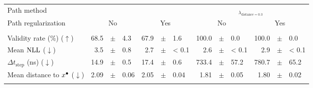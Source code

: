 \documentclass[../main.tex]{subfiles}
\begin{document}
\footnotesize
\begin{adjustwidth}{-2.7in}{-3in}
	\begin{center}
		\begin{tabular}{lrllrllrllrll}
			\toprule
			Path method                                    & \multicolumn{6}{c}{\ls{}}                  & \multicolumn{6}{c}{\revise{}$_{\lambda_{\text{distance} = 0.3}}$}                                                                                                                           \\
			Path regularization                            & \multicolumn{3}{c}{No}                     & \multicolumn{3}{c}{Yes}                                           & \multicolumn{3}{c}{No} & \multicolumn{3}{c}{Yes}                                                                        \\
			\midrule
			                                               & \multicolumn{12}{c}{\CakeOnSea}                                                                                                                                                                                                          \\
			\cmidrule(lr){2-13}
			Validity rate (\%) ($\uparrow$)                & 68.5                                       & $\pm$                                                             & 4.3                    & 67.9                    & $\pm$ & 1.6     & 100.0  & $\pm$ & 0.0   & 100.0   & $\pm$ & 0.0     \\
			Mean $\text{NLL}$ ($\downarrow$)                     & 3.5                                        & $\pm$                                                             & 0.8                    & 2.7                     & $\pm$ & < 0.1   & 2.6    & $\pm$ & < 0.1 & 2.9     & $\pm$ & < 0.1   \\
			$\Delta t_\text{step}$ (ns) ($\downarrow$)     & 14.9                                       & $\pm$                                                             & 0.5                    & 17.4                    & $\pm$ & 0.6     & 733.4  & $\pm$ & 57.2  & 780.7   & $\pm$ & 65.2    \\
			Mean distance to $x^\bullet$ ($\downarrow$) & 2.09                                       & $\pm$                                                             & 0.06                   & 2.05                    & $\pm$ & 0.04    & 1.81   & $\pm$ & 0.05  & 1.80    & $\pm$ & 0.02    \\
			\midrule
			                                               & \multicolumn{12}{c}{\ForestCover}                                                                                                                                                                                                        \\

\end{tabular}
\end{center}
\end{adjustwidth}
\end{document}
